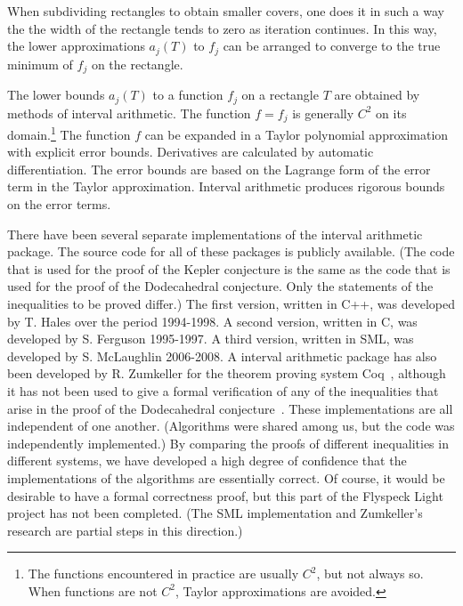 \documentclass{article} %
\begin{document}
When subdividing rectangles to obtain smaller covers, one does
it in such a way the the width of the rectangle tends to zero
as iteration continues.
In this way,  the lower approximations 
$a_j(T)$ to $f_j$ can be arranged to converge to the true minimum of $f_j$ on the
rectangle.

The lower bounds $a_j(T)$ to a function $f_j$ on a rectangle $T$
are obtained by methods of interval arithmetic.  The function
$f=f_j$ is generally $C^2$ on its domain.\footnote{The functions
 encountered in practice are usually $C^2$, but not always so.  When functions are not
$C^2$,  Taylor approximations are avoided.}  
The function $f$ can be expanded in a Taylor polynomial approximation with
explicit error bounds.  Derivatives are calculated by automatic
differentiation.  The error bounds are based on the Lagrange form of
the error term in the Taylor approximation.  Interval arithmetic produces rigorous bounds on the error terms.


There have been several separate implementations of the interval
arithmetic package. The source code for all of these packages is
publicly available. (The code that is used for the proof of the Kepler
conjecture is the same as the code that is used for the proof of the
Dodecahedral conjecture. Only the statements of the inequalities to be
proved differ.) The first version, written in
C++, was developed by T. Hales over the
period 1994-1998. A second version, written in C, was developed by S.
Ferguson 1995-1997. A third version, written in SML, was developed by
S. McLaughlin 2006-2008. A interval arithmetic package has also been
developed by R. Zumkeller for the theorem proving system
Coq~\cite{Bertot:2004:CoqBook}, although it has not been used to give
a formal verification of any of the inequalities that arise in the
proof of the Dodecahedral conjecture~\cite{Zumkeller:2008:Thesis}.
These implementations are all independent of one another. (Algorithms
were shared among us, but the code was independently implemented.) By
comparing the proofs of different inequalities in different systems,
we have developed a high degree of confidence that the implementations
of the algorithms are essentially correct. Of course, it would be
desirable to have a formal correctness proof, but this part of the
Flyspeck Light project has not been completed. (The SML implementation
and Zumkeller's research are partial steps in this direction.)
\end{document}
